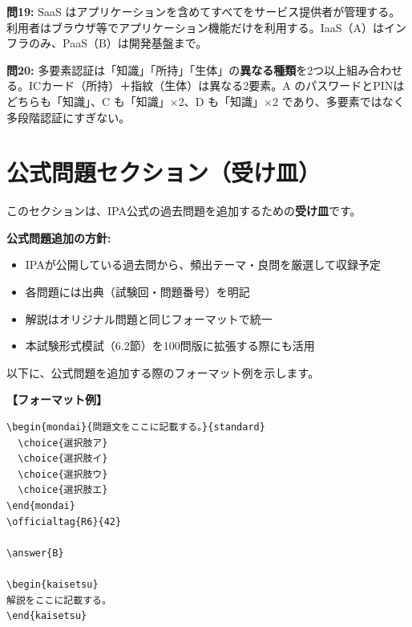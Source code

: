 \begin{kaisetsu}
\textbf{問19:} SaaS はアプリケーションを含めてすべてをサービス提供者が管理する。利用者はブラウザ等でアプリケーション機能だけを利用する。IaaS（A）はインフラのみ、PaaS（B）は開発基盤まで。
\end{kaisetsu}

\begin{kaisetsu}
\textbf{問20:} 多要素認証は「知識」「所持」「生体」の\textbf{異なる種類}を2つ以上組み合わせる。ICカード（所持）＋指紋（生体）は異なる2要素。A のパスワードとPINはどちらも「知識」、C も「知識」×2、D も「知識」×2 であり、多要素ではなく多段階認証にすぎない。
\end{kaisetsu}

\section{公式問題セクション（受け皿）}

このセクションは、IPA公式の過去問題を追加するための\textbf{受け皿}です。

\begin{keypoint}
\textbf{公式問題追加の方針:}
\begin{itemize}
  \item IPAが公開している過去問から、頻出テーマ・良問を厳選して収録予定
  \item 各問題には出典（試験回・問題番号）を明記
  \item 解説はオリジナル問題と同じフォーマットで統一
  \item 本試験形式模試（6.2節）を100問版に拡張する際にも活用
\end{itemize}
\end{keypoint}

\vspace{1em}
\noindent 以下に、公式問題を追加する際のフォーマット例を示します。

\vspace{0.5em}

\noindent\textbf{【フォーマット例】}

\begin{tcolorbox}[
  enhanced,
  colback=LightGray,
  colframe=SubBlue,
  boxrule=0.4pt,
  arc=3pt,
  left=8pt, right=8pt, top=6pt, bottom=6pt
]
{\small
\begin{verbatim}
\begin{mondai}{問題文をここに記載する。}{standard}
  \choice{選択肢ア}
  \choice{選択肢イ}
  \choice{選択肢ウ}
  \choice{選択肢エ}
\end{mondai}
\officialtag{R6}{42}

\answer{B}

\begin{kaisetsu}
解説をここに記載する。
\end{kaisetsu}
\end{verbatim}
}
\end{tcolorbox}

